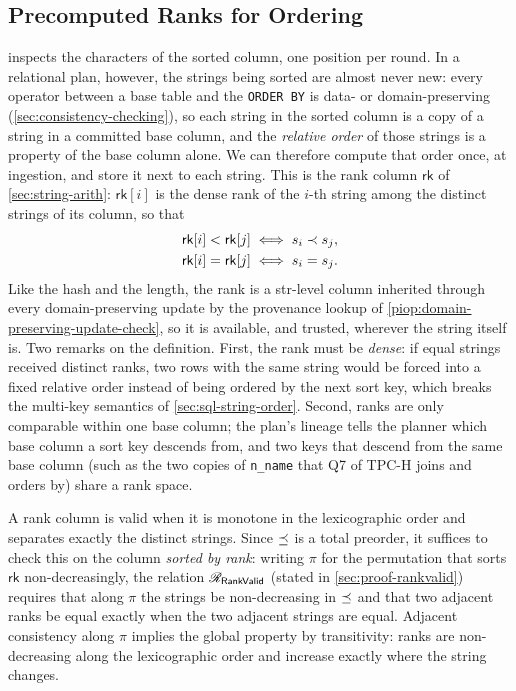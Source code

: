\subsection{Precomputed Ranks for Ordering}
\label{sec:rank}

 inspects the characters of the sorted column, one position per round. In a relational plan, however, the strings being sorted are almost never new: every operator between a base table and the \texttt{ORDER BY} is data- or domain-preserving (\cref{sec:consistency-checking}), so each string in the sorted column is a copy of a string in a committed base column, and the \emph{relative order} of those strings is a property of the base column alone. We can therefore compute that order once, at ingestion, and store it next to each string. This is the rank column $\mathsf{rk}$ of \cref{sec:string-arith}: $\mathsf{rk}[i]$ is the dense rank of the $i$-th string among the distinct strings of its column, so that
\begin{displaymath}
  \begin{aligned}
    \mathsf{rk}[i] < \mathsf{rk}[j] &\iff s_i \prec s_j, \\
    \mathsf{rk}[i] = \mathsf{rk}[j] &\iff s_i = s_j .
  \end{aligned}
\end{displaymath}
Like the hash and the length, the rank is a str-level column inherited through every domain-preserving update by the provenance lookup of \cref{piop:domain-preserving-update-check}, so it is available, and trusted, wherever the string itself is. Two remarks on the definition. First, the rank must be \emph{dense}: if equal strings received distinct ranks, two rows with the same string would be forced into a fixed relative order instead of being ordered by the next sort key, which breaks the multi-key semantics of \cref{sec:sql-string-order}. Second, ranks are only comparable within one base column; the plan's lineage tells the planner which base column a sort key descends from, and two keys that descend from the same base column (such as the two copies of \texttt{n\_name} that Q7 of TPC-H joins and orders by) share a rank space.

A rank column is valid when it is monotone in the lexicographic order and separates exactly the distinct strings. Since $\preceq$ is a total preorder, it suffices to check this on the column \emph{sorted by rank}: writing $\pi$ for the permutation that sorts $\mathsf{rk}$ non-decreasingly, the relation $\mathscr{R}_{\mathsf{RankValid}}$ (stated in \cref{sec:proof-rankvalid}) requires that along $\pi$ the strings be non-decreasing in $\preceq$ and that two adjacent ranks be equal exactly when the two adjacent strings are equal. Adjacent consistency along $\pi$ implies the global property by transitivity: ranks are non-decreasing along the lexicographic order and increase exactly where the string changes.


